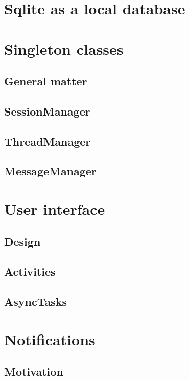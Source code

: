 \documentclass[12pt,a4paper,oneside]{report}
\begin{document}
\section{Sqlite as a local database}

\section{Singleton classes}

\subsection{General matter}

\subsection{SessionManager}

\subsection{ThreadManager}

\subsection{MessageManager}

\section{User interface}

\subsection{Design}

\subsection{Activities}

\subsection{AsyncTasks}

\section{Notifications}

\subsection{Motivation}
\end{document}
